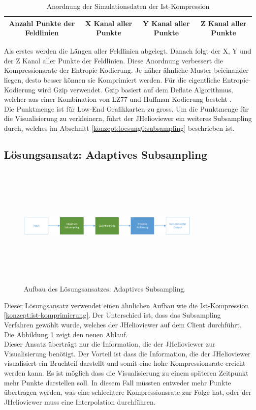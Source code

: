 \begin{table}[!htbp]
	\center
	\begin{tabular}{|c|c|c|c|}
	\hline
	Anzahl Punkte der Feldlinien & X Kanal aller Punkte & Y Kanal aller Punkte & Z Kanal aller Punkte \\\hline
	\end{tabular}
	\caption{Anordnung der Simulationsdaten der Ist-Kompression}
	\label{konzept:ist:entropie}
\end{table}
Als erstes werden die Längen aller Feldlinien abgelegt. Danach folgt der X, Y und der Z Kanal aller Punkte der Feldlinien. Diese Anordnung verbessert die Kompressionsrate der Entropie Kodierung. Je näher ähnliche Muster beieinander liegen, desto besser können sie Komprimiert werden. Für die eigentliche Entropie-Kodierung wird Gzip verwendet. Gzip basiert auf dem Deflate Algorithmus, welcher aus einer Kombination von LZ77 und Huffman Kodierung besteht \cite{wiki:gzip}.\\
Die Punktmenge ist für Low-End Grafikkarten zu gross. Um die Punktmenge für die Visualisierung zu verkleinern, führt der JHelioviewer ein weiteres Subsampling durch, welches im Abschnitt \ref{konzept:loesung0:subsampling} beschrieben ist.

\subsection{Lösungsansatz: Adaptives Subsampling} \label{konzept:loesung0}
\begin{figure}[!htbp]
	\center
	\includegraphics[width=0.8\textwidth,height=6cm,keepaspectratio]{./pictures/konzept/solution0/aufbau.png}
	\caption{Aufbau des Lösungsansatzes: Adaptives Subsampling.}
	\label{konzept:loesung0:aufbau:diagramm}
\end{figure} 
Dieser Lösungsansatz verwendet einen ähnlichen Aufbau wie die Ist-Kompression \ref{konzept:ist-komprimierung}. Der Unterschied ist, dass das Subsampling Verfahren gewählt wurde, welches der JHelioviewer auf dem Client durchführt. Die Abbildung \ref{konzept:loesung0:aufbau:diagramm} zeigt den neuen Ablauf.\\
Dieser Ansatz überträgt nur die Information, die der JHelioviewer zur Visualisierung benötigt. Der Vorteil ist dass die Information, die der JHelioviewer visualisiert ein Bruchteil darstellt und somit eine hohe Kompressionsrate ereicht werden kann. Es ist möglich dass die Visualisierung zu einem späteren Zeitpunkt mehr Punkte darstellen soll. In diesem Fall müssten entweder mehr Punkte übertragen werden, was eine schlechtere Kompressionsrate zur Folge hat, oder der JHelioviewer muss eine Interpolation durchführen. 

